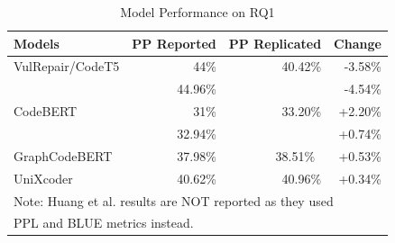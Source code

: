 \begin{table}[h]
\centering
  \caption{Model Performance on RQ1}
  \label{Methodology:RQ1-dataset-ModelPerformance}
  \begin{tabular}{|l|r|r|r|}
    \hline
    Models          & PP Reported    & PP Replicated & Change\\
    \hline
    VulRepair/CodeT5       & 44\%\cite{fu2022vulrepair}     & 40.42\% & -3.58\%\\
    &44.96\%\cite{zhang2023pre}  & & -4.54\%\\
    \hline
    CodeBERT        & 31\%\cite{fu2022vulrepair}      & 33.20\% & +2.20\%\\
    & 32.94\%\cite{zhang2023pre} && +0.74\%\\
    \hline
    GraphCodeBERT   & 37.98\%\cite{zhang2023pre}      & 38.51\%\ & +0.53\%\\
    \hline
    UniXcoder       & 40.62\%\cite{zhang2023pre}      & 40.96\% & +0.34\%\\
  \hline
  \multicolumn{4}{l}{Note: Huang et al.\cite{huang2023empirical} results are NOT reported as they used}\\
  \multicolumn{4}{l}{PPL and BLUE metrics instead.}\\
\end{tabular}
\end{table}





